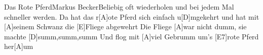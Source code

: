 \documentclass[../main.tex]{subfiles}
\begin{document}
\begin{song}[3]{Das Rote Pferd}{Markus Becker}{Beliebig oft wiederholen und bei jedem Mal schneller werden.}
Da hat das r[A]ote Pferd sich einfach u[D]mgekehrt
und hat mit [A]seinem Schwanz die [E]Fliege abgewehrt
Die Fliege [A]war nicht dumm, sie machte [D]summ,summ,summ
Und flog mit [A]viel Gebrumm um's [E7]rote Pferd her[A]um
\end{song}
\end{document}
